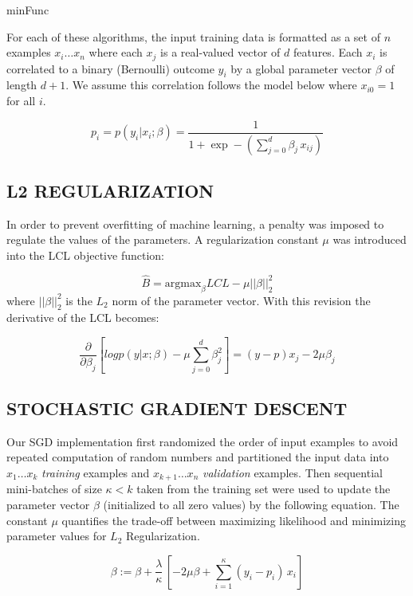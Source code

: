 minFunc\cite{minFunc}

For each of these algorithms, the input training data is formatted as a set of $n$ examples $x_i \ldots x_n$ where each $x_j$ is a real-valued vector of $d$ features. Each $x_i$ is correlated to a binary (Bernoulli) outcome $y_i$ by a global parameter vector $\beta$ of length $d+1$. We assume this correlation follows the model below where $x_{i0}=1$ for all $i$.

\begin{equation}
    p_i = p(y_i|x_i;\beta) = \frac{1}{1+\exp-(\sum_{j=0}^{d} \beta_j\,x_{ij})}
\end{equation}


\subsection{L2 REGULARIZATION}
In order to prevent overfitting of machine learning, a penalty was imposed to regulate the values of the parameters. A regularization constant $\mu$ was introduced into the LCL objective function:

\begin{equation}
    \hat{B} = \textrm{argmax}_{\beta} LCL - \mu||\beta||_2^2
\end{equation}
where $||\beta||_2^2$ is the $L_2$ norm of the parameter vector. With this revision the derivative of the LCL becomes:

\begin{equation}
    \frac{\partial}{\partial \beta_j} [ log p( y | x ; \beta) -\mu \sum_{j=0}^d \beta_j^2 ] = (y - p) x_j - 2 \mu \beta_j
\end{equation}




\subsection{STOCHASTIC GRADIENT DESCENT} 
Our SGD implementation first randomized the order of input examples to avoid repeated computation of random numbers and partitioned the input data into $x_1 \ldots x_k$ \emph{training} examples and $x_{k+1} \ldots x_n$ \emph{validation} examples. Then sequential mini-batches of size $\kappa < k$ taken from the training set were used to update the parameter vector $\beta$ (initialized to all zero values) by the following equation. The constant $\mu$ quantifies the trade-off between maximizing likelihood and minimizing parameter values for $L_2$ Regularization.

\begin{equation}
    \beta := \beta + \frac{\lambda}{\kappa}\,[-2 \mu \beta + \sum_{i=1}^{\kappa} (y_i - p_i)\,x_i]
\end{equation}

